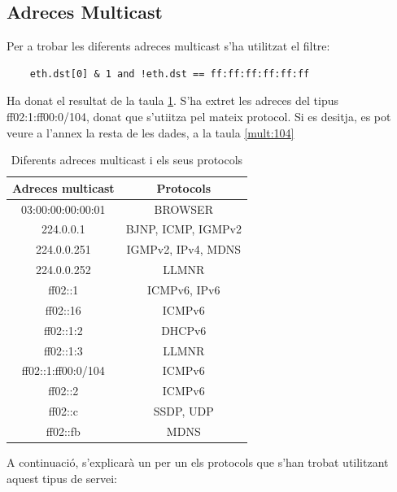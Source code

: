\documentclass{article}
\begin{document}
\subsection{Adreces Multicast}
Per a trobar les diferents adreces multicast s'ha utilitzat el filtre:
\begin{lstlisting}
	eth.dst[0] & 1 and !eth.dst == ff:ff:ff:ff:ff:ff
\end{lstlisting}
Ha donat el resultat de la taula \ref{mult}. S'ha extret les adreces del tipus
ff02:1:ff00:0/104, donat que s'utiitza pel mateix protocol. Si es desitja, es pot
veure a l'annex la resta de les dades, a la taula \ref{mult:104}
\begin{table}[!h]
\centering
\begin{tabular}{cc}
Adreces multicast &Protocols\\
\hline
03:00:00:00:00:01 &BROWSER\\
224.0.0.1 &BJNP, ICMP, IGMPv2\\
224.0.0.251 &IGMPv2, IPv4, MDNS\\
224.0.0.252 &LLMNR\\
ff02::1 &ICMPv6, IPv6\\
ff02::16 &ICMPv6\\
ff02::1:2 &DHCPv6\\
ff02::1:3 &LLMNR\\
ff02::1:ff00:0/104 &ICMPv6\\
ff02::2 &ICMPv6\\
ff02::c &SSDP, UDP\\
ff02::fb &MDNS\\
\end{tabular}
\caption{Diferents adreces multicast i els seus protocols}
\label{mult}
\end{table}
A continuació, s'explicarà un per un els protocols que s'han trobat 
utilitzant aquest tipus de servei:\\
\end{document}
